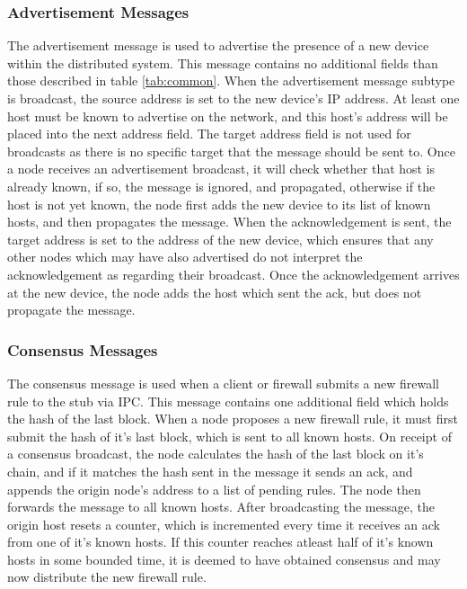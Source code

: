 \documentclass[a4paper, 11pt]{report}
\begin{document}
\subsubsection{Advertisement Messages}
The advertisement message is used to advertise the presence of a new device within the distributed system. This message contains no additional fields than those described in table \ref{tab:common}. When the advertisement message subtype is broadcast, the source address is set to the new device's \acrshort{IP} address. At least one host must be known to advertise on the network, and this host's address will be placed into the next address field. The target address field is not used for broadcasts as there is no specific target that the message should be sent to. Once a node receives an advertisement broadcast, it will check whether that host is already known, if so, the message is ignored, and propagated, otherwise if the host is not yet known, the node first adds the new device to its list of known hosts, and then propagates the message. When the acknowledgement is sent, the target address is set to the address of the new device, which ensures that any other nodes which may have also advertised do not interpret the acknowledgement as regarding their broadcast. Once the acknowledgement arrives at the new device, the node adds the host which sent the ack, but does not propagate the message.

\subsubsection{Consensus Messages}
The consensus message is used when a client or firewall submits a new firewall rule to the \gls{stub} via \acrshort{IPC}. This message contains one additional field which holds the hash of the last block. When a node proposes a new firewall rule, it must first submit the hash of it's last block, which is sent to all known hosts. On receipt of a consensus broadcast, the node calculates the hash of the last block on it's chain, and if it matches the hash sent in the message it sends an ack, and appends the origin node's address to a list of pending rules. The node then forwards the message to all known hosts. After broadcasting the message, the origin host resets a counter, which is incremented every time it receives an ack from one of it's known hosts. If this counter reaches atleast half of it's known hosts in some bounded time, it is deemed to have obtained consensus and may now distribute the new firewall rule.
\end{document}

